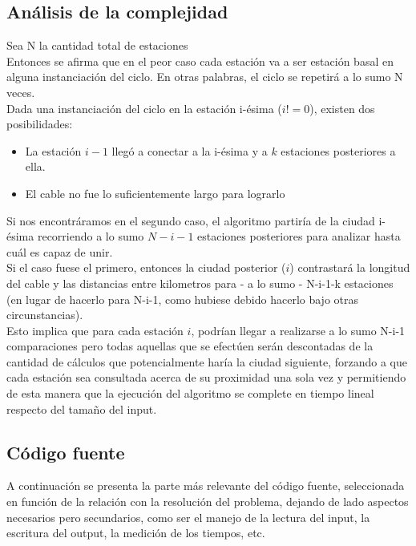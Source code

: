 \newpage
\subsection{An\'alisis de la complejidad}


Sea N la cantidad total de estaciones \\

Entonces se afirma que en el peor caso cada estación va a ser estación basal en alguna instanciación del ciclo. En otras palabras, el ciclo se repetirá a lo sumo N veces.\\
Dada una instanciación del ciclo en la estación i-ésima ($i != 0$), existen dos posibilidades:
\begin{itemize}
\item	La estación $i-1$ llegó a conectar a la i-ésima y a $k$ estaciones posteriores a ella.
\item	El cable no fue lo suficientemente largo para lograrlo
\end{itemize}

Si nos encontráramos en el segundo caso, el algoritmo partiría de la ciudad i-ésima recorriendo a lo sumo $N-i-1$ estaciones posteriores para analizar hasta cuál es capaz de unir.\\
Si el caso fuese el primero, entonces la ciudad posterior ($i$) contrastará la longitud del cable y las distancias entre kilometros para - a lo sumo - N-i-1-k estaciones (en lugar de hacerlo para N-i-1, como hubiese debido hacerlo bajo otras circunstancias).\\

Esto implica que para cada estación $i$, podrían llegar a realizarse a lo sumo N-i-1 comparaciones pero todas aquellas que se efectúen serán descontadas de la cantidad de cálculos que potencialmente haría la ciudad siguiente, forzando a que cada estación sea consultada acerca de su proximidad una sola vez y permitiendo de esta manera que la ejecución del algoritmo se complete en tiempo lineal respecto del tamaño del input.\\ 

 \newpage
\subsection{C\'odigo fuente}

A continuación se presenta la parte más relevante del código fuente, seleccionada en función de la relación con la resolución del problema, dejando de lado aspectos necesarios pero secundarios, como ser el manejo de la lectura del input, la escritura del output, 
la medición de los tiempos, etc.

